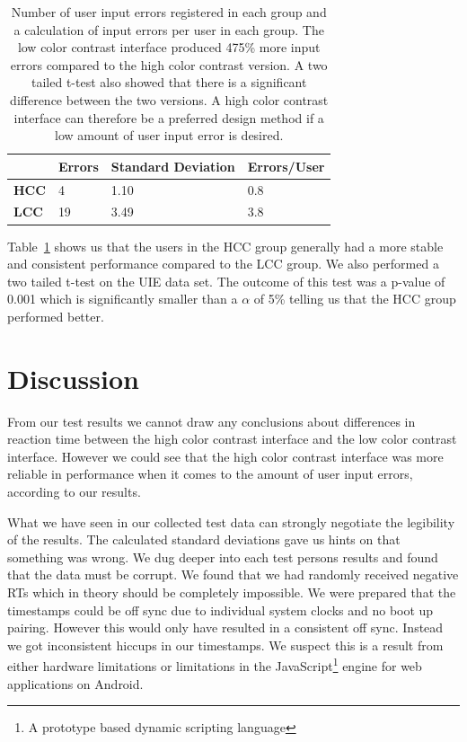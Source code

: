 \documentclass[runningheads,a4paper]{llncs}
\begin{document}
\begin{table}[]
	\centering
	\setlength{\tabcolsep}{1em}
	\setlength\extrarowheight{1em}
	\begin{tabular}{l|l|l|l}
		\textbf{} & \textbf{Errors} & \textbf{Standard Deviation} & \textbf{Errors/User} \\ \hline
		\textbf{HCC} & 4 & 1.10 & 0.8 \\ \hline
		\textbf{LCC} & 19 & 3.49 & 3.8
	\end{tabular}
	\caption{Number of user input errors registered in each group and a calculation of input errors per user in each group. The low color contrast interface produced 475\% more input errors compared to the high color contrast version. A two tailed t-test also showed that there is a significant difference between the two versions. A high color contrast interface can therefore be a preferred design method if a low amount of user input error is desired.
	\label{tab:userIE}}
\end{table}

Table~\ref{tab:userIE} shows us that the users in the HCC group generally had a more stable and consistent performance compared to the LCC group. We also performed a two tailed t-test on the UIE data set. The outcome of this test was a p-value of 0.001 which is significantly smaller than a $\alpha$ of 5\% telling us that the HCC group performed better.

\section{Discussion}\label{sec:discussion}
From our test results we cannot draw any conclusions about differences in reaction time between the high color contrast interface and the low color contrast interface. However we could see that the high color contrast interface was more reliable in performance when it comes to the amount of user input errors, according to our results. 

What we have seen in our collected test data can strongly negotiate the legibility of the results. The calculated standard deviations gave us hints on that something was wrong. We dug deeper into each test persons results and found that the data must be corrupt. We found that we had randomly received negative RTs which in theory should be completely impossible. We were prepared that the timestamps could be off sync due to individual system clocks and no boot up pairing. However this would only have resulted in a consistent off sync. Instead we got inconsistent hiccups in our timestamps. We suspect this is a result from either hardware limitations or limitations in the JavaScript\footnote{A prototype based dynamic scripting language} engine for web applications on Android.
\end{document}
